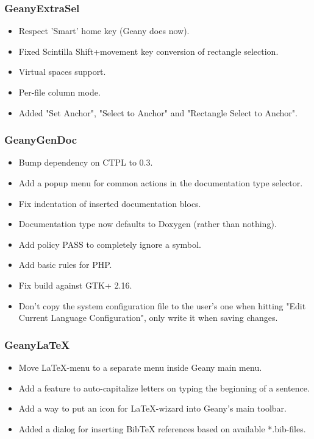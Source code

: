 \documentclass[%
paper=a4,%
fontsize=12pt,%
twoside=false,%
DIV18,
headsepline,
plainheadsepline,
footsepline,
plainfootsepline,
parskip=half,%
openany,%
]{scrartcl}
\begin{document}
\subsubsection{GeanyExtraSel}
\begin{itemize}
	\item Respect 'Smart' home key (Geany does now).
	\item Fixed Scintilla Shift+movement key conversion of rectangle selection.
	\item Virtual spaces support.
	\item Per-file column mode.
	\item Added "Set Anchor", "Select to Anchor" and "Rectangle Select to Anchor".
\end{itemize}

\subsubsection{GeanyGenDoc}
\begin{itemize}
	\item Bump dependency on CTPL to 0.3.
	\item Add a popup menu for common actions in the documentation type selector.
	\item Fix indentation of inserted documentation blocs.
	\item Documentation type now defaults to Doxygen (rather than nothing).
	\item Add policy PASS to completely ignore a symbol.
	\item Add basic rules for PHP.
	\item Fix build against GTK+ 2.16.
	\item Don't copy the system configuration file to the user's one when hitting
      "Edit Current Language Configuration", only write it when saving changes.
\end{itemize}

\subsubsection{GeanyLaTeX}
\begin{itemize}
	\item Move LaTeX-menu to a separate menu inside Geany main menu.
	\item Add a feature to auto-capitalize letters on typing the beginning of a sentence.
	\item Add a way to put an icon for LaTeX-wizard into Geany's main toolbar.
	\item Added a dialog for inserting BibTeX references based on available *.bib-files.
\end{itemize}
\end{document}
